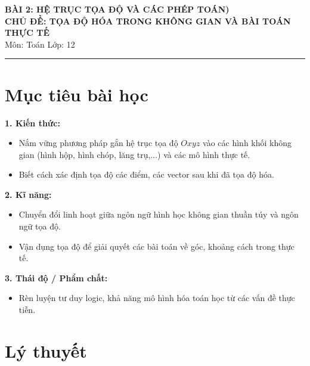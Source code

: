 \documentclass[12pt]{article}
\begin{document}
	
	\begin{center}
		{\large \bfseries{BÀI 2: HỆ TRỤC TỌA ĐỘ VÀ CÁC PHÉP TOÁN)}}\\[4pt]
		{\Large \bfseries{CHỦ ĐỀ: TỌA ĐỘ HÓA TRONG KHÔNG GIAN VÀ BÀI TOÁN THỰC TẾ}}\\[4pt]
		{\large Môn: Toán \quad Lớp: 12}
	\end{center}
	\vspace{4mm}
	\hrule
	\vspace{4mm}
	
	\section*{Mục tiêu bài học}
	
	\textbf{1. Kiến thức:}
	\begin{itemize}
		\item Nắm vững phương pháp gắn hệ trục tọa độ $Oxyz$ vào các hình khối không gian (hình hộp, hình chóp, lăng trụ,...) và các mô hình thực tế.
		\item Biết cách xác định tọa độ các điểm, các vector sau khi đã tọa độ hóa.
	\end{itemize}
	
	\noindent\textbf{2. Kĩ năng:}
	\begin{itemize}
		\item Chuyển đổi linh hoạt giữa ngôn ngữ hình học không gian thuần túy và ngôn ngữ tọa độ.
		\item Vận dụng tọa độ để giải quyết các bài toán về góc, khoảng cách trong thực tế.
	\end{itemize}
	
	\noindent\textbf{3. Thái độ / Phẩm chất:}
	\begin{itemize}
		\item Rèn luyện tư duy logic, khả năng mô hình hóa toán học từ các vấn đề thực tiễn.
	\end{itemize}
	
	\newpage
	
	\setcounter{tocdepth}{2}
	\tableofcontents
	\newpage
	
	\section{Lý thuyết}
	
\end{document}
